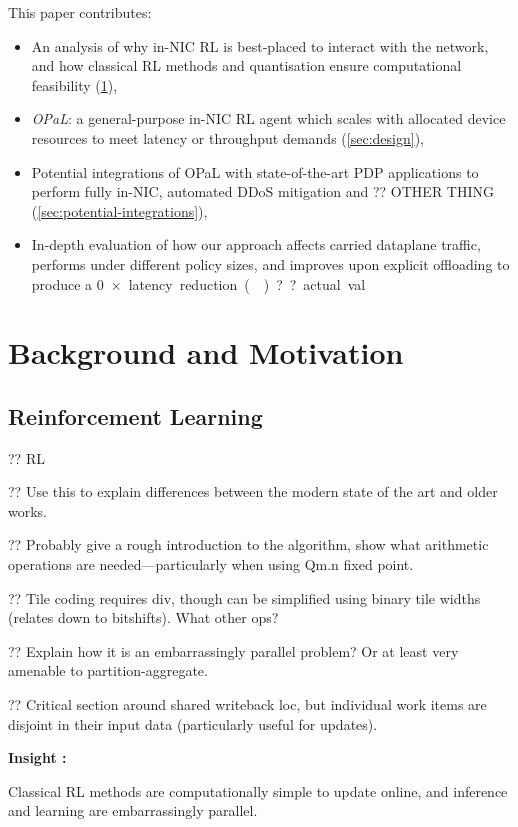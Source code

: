 \documentclass[sigconf,natbib=false]{acmart}
\newcommand{\approachshort}{OPaL}
\newcounter{insightc}
\newenvironment{insight}
	{
		\begin{tipblock}\refstepcounter{insightc}\textbf{Insight \theinsightc:}\em
	}
	{
		\end{tipblock}
	}
\begin{document}
This paper contributes:
\begin{itemize}
	\item An analysis of why in-NIC RL is best-placed to interact with the network, and how classical RL methods and quantisation ensure computational feasibility (\cref{sec:motivation}),
	\item \emph{\approachshort{}}: a general-purpose in-NIC RL agent which scales with allocated device resources to meet latency or throughput demands (\cref{sec:design}),
	\item Potential integrations of \approachshort{} with state-of-the-art PDP applications to perform fully in-NIC, automated DDoS mitigation and ?? OTHER THING (\cref{sec:potential-integrations}),
	\item In-depth evaluation of how our approach affects carried dataplane traffic, performs under different policy sizes, and improves upon explicit offloading to produce a \SI{0}{$\times$} latency reduction (). ??actual val
\end{itemize}

\section{Background and Motivation}\label{sec:motivation}
\subsection{Reinforcement Learning}
?? RL~\parencite{RL2E}

?? Use this to explain differences between the modern state of the art and older works.

?? Probably give a rough introduction to the algorithm, show what arithmetic operations are needed---particularly when using Qm.n fixed point.

?? Tile coding requires div, though can be simplified using binary tile widths (relates down to bitshifts). What other ops?

?? Explain how it is an embarrassingly parallel problem? Or at least very amenable to partition-aggregate.

?? Critical section around shared writeback loc, but individual work items are disjoint in their input data (particularly useful for updates).

\begin{insight}
	Classical RL methods are computationally simple to update online, and inference and learning are embarrassingly parallel.
\end{insight}
\end{document}

